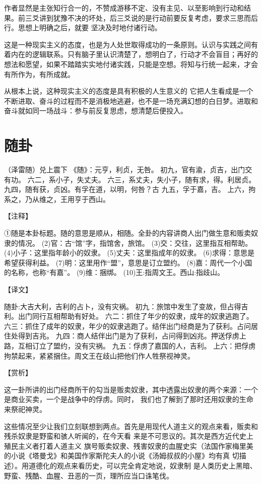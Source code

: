 \documentclass[a4paper,12pt,UTF8,twoside]{ctexbook}
\begin{document}
作者显然是主张知行合一的，不赞成游移不定、没有主见、以至影响到行动和结果。前三爻讲到犹豫不决的坏处，后三爻说的是行动前要反复考虑，要求三思而后行。思想上明确之后，就要 坚决及时地付诸行动。

这是一种现实主义的态度，也是为人处世取得成功的一条原则。认识与实践之间有着内在的逻辑联系。只有脑子里认识清楚了，想明白了，行动才不会盲目；再好的想法和愿望，如果不踏踏实实地付诸实践，只能是空想。将知与行统一起来，才会有所作为，有所成就。

从根本上说，这种现实主义的态度是具有积极的人生意义的 它把人生看成是一个不断进取、奋斗的过程而不是消极地逃避，也不是一场充满幻想的白日梦。进取和奋斗就如同一场战斗：参与前反复思虑，想清楚后便投入。

\chapter{随卦}

（泽雷随）兑上震下
《随》：元亨，利贞，无咎。
初九，官有渝，贞吉，出门交有功。
六二，系小子，失丈夫。
六三，系丈夫，失小子，随有求，得。利居贞。
九四，随有获，贞凶。有孚在道，以明，何咎？古
九五，孚于嘉，吉。
上六，拘系之，乃从维之，王用亨于西山。

【注释】

①随是本卦标题。随的意思是顺从，相随。全卦的内容讲商人出门做生意和贩卖奴隶的情况。
(2)官：古“馆”字，指馆舍，旅馆。
(3)交：交往，这里指互相帮助。
(4)小子：这里指年龄小的奴隶。
(5)丈夫：这里指成年的奴隶。
(6)求得：意思是希望获得利益。
(7)明：这里用作“盟”，意思是订立盟约。
(8)嘉：周代一个小国的名称，也称“有嘉”。
(9)维：捆绑。
(10)王:指周文王。西山:指歧山。

【译文】

随卦:大吉大利，吉利的占卜，没有灾祸。
初九：旅馆中发生了变故，但占得吉利。出门同行互相帮助有好处。
六二：抓住了年少的奴隶，成年的奴隶逃跑了。
六三：抓住了成年的奴隶，年少的奴隶逃跑了。结伴出门经商是为了获利。占问居住处得到吉兆。
九四：商人结伴出门是为了获利，占问得到凶兆。押送俘虏上路，互相订立了盟约，没有灾祸。
九五：俘虏了嘉国的人，吉利。
上六：把俘虏拘禁起来，紧紧捆住。周文王在歧山把他们作人牲祭视神灵。

【赏析】

这一卦所讲的出门经商所干的勾当是贩卖奴隶，其中透露出奴隶的两个来源：一个是商业买卖，一个是战争中的俘虏。同时， 我们也了解到了那时还用奴隶的生命来祭祀神灵。

这些情况至少让我们立刻联想到两点。首先是用现代人道主义的观点来看，贩卖和残杀奴隶是野蛮和骇人听闻的，在今天看 来是不可思议的。其次是西方近代史上殖民主义者打着人道主义 旗号贩卖奴隶、残害奴隶的血腥史实（法国作家梅里美的小说《塔曼戈》和美国作家斯陀夫人的小说《汤姆叔叔的小屋》均有真 切描述）。用道德化的观点来看历史，可以完全肯定地说，奴隶制 是人类历史上黑暗、野蛮、残酷、血腥、丑恶的一页，理所应当口诛笔伐。
\end{document}
